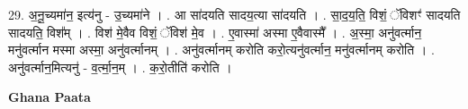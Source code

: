 \documentclass[17pt]{extarticle}
\begin{document}
29. अ॒नू॒च्यमा॑न॒ इत्य॑नु - उ॒च्यमा॑ने । . आ सा॑दयति सादय॒त्या सा॑दयति । . सा॒द॒य॒ति॒ विशं॒ ॅविशꣳ॑ सादयति सादयति॒ विश᳚म् । . विश॑ मे॒वैव विशं॒ ॅविश॑ मे॒व । . ए॒वास्मा॑ अस्मा ए॒वैवास्मै᳚ । . अ॒स्मा॒ अनु॑वर्त्मान॒ मनु॑वर्त्मान मस्मा अस्मा॒ अनु॑वर्त्मानम् । . अनु॑वर्त्मानम् करोति करो॒त्यनु॑वर्त्मान॒ मनु॑वर्त्मानम् करोति । . अनु॑वर्त्मान॒मित्यनु॑ - व॒र्त्मा॒न॒म् । . क॒रो॒तीति॑ करोति । \newline

\textbf{Ghana Paata } \newline
\end{document}
